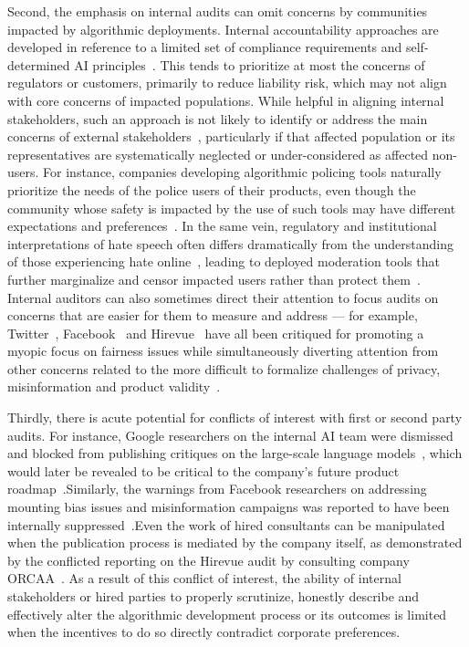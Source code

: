 \documentclass[sigconf]{acmart}
\begin{document}
Second, the emphasis on internal audits can omit concerns by communities impacted by algorithmic deployments. Internal accountability approaches are developed in reference to a limited set of compliance requirements and self-determined AI principles~\cite{raji2020closing}. This tends to prioritize at most the concerns of regulators or customers, primarily to reduce liability risk, which may not align with core concerns of impacted populations. While helpful in aligning internal stakeholders, such an approach is not likely to identify or address the main concerns of external stakeholders~\cite{mittelstadt2019principles, raji2020closing}, particularly if that affected population or its representatives are systematically neglected or under-considered as affected non-users. For instance, companies developing algorithmic policing tools naturally prioritize the needs of the police users of their products, even though the community whose safety is impacted by the use of such tools may have different expectations and preferences~\cite{mcgrory2020targeted}. In the same vein, regulatory and institutional interpretations of hate speech often differs dramatically from the understanding of those experiencing hate online~\cite{kumar2021designing}, leading to deployed moderation tools that further marginalize and censor impacted users rather than protect them~\cite{diaz2021double}. Internal auditors can also sometimes direct their attention to focus audits on concerns that are easier for them to measure and address --- for example, Twitter~\cite{twitter1}, Facebook~\cite{hao2021facebook} and Hirevue~\cite{hirevueAP} have all been critiqued for promoting a myopic focus on fairness issues while simultaneously diverting attention from other concerns related to the more difficult to formalize challenges of privacy, misinformation and product validity~\cite{engler2021independent}. 

Thirdly, there is acute potential for conflicts of interest with first or second party audits. For instance, Google researchers on the internal AI team were dismissed and blocked from publishing critiques on the large-scale language models~\cite{hao2020wetimnit1, ebell2021towardstimnit2}, which would later be revealed to be critical to the company's future product roadmap~\cite{fedus2021switch, googl1, googl2}.Similarly, the warnings from Facebook researchers on addressing mounting bias issues and misinformation campaigns was reported to have been internally suppressed~\cite{oremus}.Even the work of hired consultants can be manipulated when the publication process is mediated by the company itself, as demonstrated by the conflicted reporting on the Hirevue audit by consulting company ORCAA~\cite{engler2021independent}. As a result of this conflict of interest, the ability of internal stakeholders or hired parties to properly scrutinize, honestly describe and effectively alter the algorithmic development process or its outcomes is limited when the incentives to do so directly contradict corporate preferences.
\end{document}
